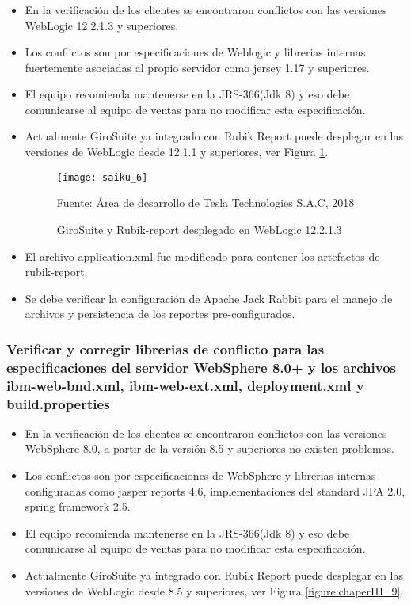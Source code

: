 \begin{spacing}{1.5}
		\subsubsection{}
			\begin{itemize}
				\item En la verificaci\'{o}n de los clientes se encontraron conflictos con las versiones WebLogic 12.2.1.3 y superiores.
				\item Los conflictos son por especificaciones de Weblogic y librerias internas fuertemente asociadas al propio servidor como jersey 1.17 y superiores.
				\item El equipo recomienda mantenerse en la JRS-366(Jdk 8) y eso debe comunicarse al equipo de ventas para no modificar esta especificaci\'{o}n.
				\item Actualmente GiroSuite ya integrado con Rubik Report puede desplegar en las versiones de WebLogic desde 12.1.1 y superiores, ver Figura \ref{figure:chaperIII_8}.
				
				\begin{figure}[H]
					\centering
					\texttt{[image: saiku\_6]}
					\caption {\centering \small{GiroSuite y Rubik-report desplegado en WebLogic 12.2.1.3}} \label{figure:chaperIII_8}
					\small {Fuente: \'{A}rea de desarrollo de Tesla Technologies S.A.C, 2018}
				\end{figure}

				\item El archivo application.xml fue modificado para contener los artefactos de rubik-report.
				\item Se debe verificar la configuraci\'{o}n de Apache Jack Rabbit para el manejo de archivos y persistencia de los reportes pre-configurados. 
			\end{itemize}
		
		
		\subsubsection{Verificar y corregir librerias de conflicto para las especificaciones del servidor WebSphere 8.0+ y los archivos ibm-web-bnd.xml, ibm-web-ext.xml, deployment.xml y build.properties}
			\begin{itemize}
				\item En la verificaci\'{o}n de los clientes se encontraron conflictos con las versiones WebSphere 8.0, a partir de la versi\'{o}n 8.5 y superiores no existen problemas.
				\item Los conflictos son por especificaciones de WebSphere y librerias internas configuradas como jasper reports 4.6, implementaciones del standard JPA 2.0, spring framework 2.5.
				\item El equipo recomienda mantenerse en la JRS-366(Jdk 8) y eso debe comunicarse al equipo de ventas para no modificar esta especificaci\'{o}n.
				\item Actualmente GiroSuite ya integrado con Rubik Report puede desplegar en las versiones de WebLogic desde 8.5 y superiores, ver Figura \ref{figure:chaperIII_9}.
				

\end{itemize}
\end{spacing}
